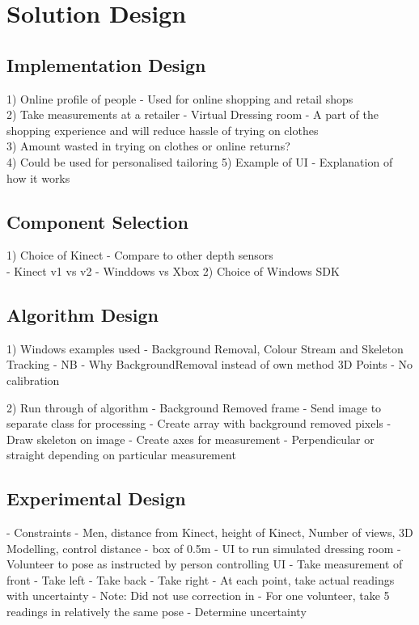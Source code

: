 \chapter{Solution Design}

\section{Implementation Design}
1) Online profile of people - Used for online shopping and retail shops\\
2) Take measurements at a retailer - Virtual Dressing room - A part of the shopping experience and will reduce hassle of trying on clothes\\
3) Amount wasted in trying on clothes or online returns?\\
4) Could be used for personalised tailoring
5) Example of UI - Explanation of how it works

\section{Component Selection}
1) Choice of Kinect - Compare to other depth sensors\\
- Kinect v1 vs v2
- Winddows vs Xbox
2) Choice of Windows SDK\\

\section{Algorithm Design}
1) Windows examples used - Background Removal, Colour Stream and Skeleton Tracking - NB - Why BackgroundRemoval instead of own method
3D Points - No calibration

2) Run through of algorithm
- Background Removed frame
- Send image to separate class for processing
- Create array with background removed pixels
- Draw skeleton on image
- Create axes for measurement - Perpendicular or straight depending on particular measurement

\section{Experimental Design}
- Constraints - Men, distance from Kinect, height of Kinect, Number of views, 3D Modelling, control distance - box of 0.5m
- UI to run simulated dressing room
- Volunteer to pose as instructed by person controlling UI
- Take measurement of front
- Take left
- Take back
- Take right 
- At each point, take actual readings with uncertainty
- Note: Did not use correction in \cite{nonContact2017}
- For one volunteer, take 5 readings in relatively the same pose - Determine uncertainty 